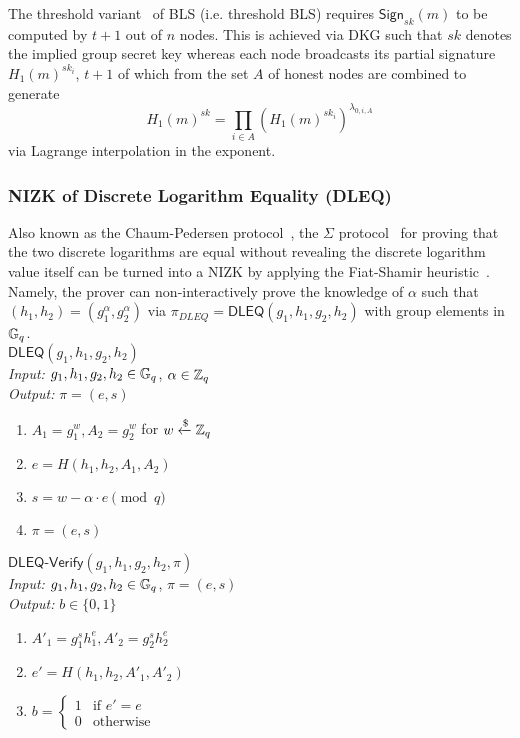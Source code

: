 The threshold variant~\cite{boldyreva2003threshold} of BLS (i.e. threshold BLS) requires $\mathsf{Sign}_{sk}(m)$ to be computed by $t + 1$ out of $n$ nodes. This is achieved via DKG such that $sk$ denotes the implied group secret key whereas each node broadcasts its partial signature $H_1(m)^{sk_i}$, $t + 1$ of which from the set $A$ of honest nodes are combined to generate
\[
H_1(m)^{sk} = \prod_{i \in A} \left(H_1(m)^{sk_i}\right)^{\lambda_{0, i, A}}
\]
via Lagrange interpolation in the exponent.

\subsubsection{NIZK of Discrete Logarithm Equality (DLEQ)}
\label{appendix:dleq}
Also known as the Chaum-Pedersen protocol~\cite{chaum1992wallet}, the $\Sigma$ protocol~\cite{damgaard2002sigma} for proving that the two discrete logarithms are equal without revealing the discrete logarithm value itself can be turned into a NIZK by applying the Fiat-Shamir heuristic~\cite{fiat1986prove}. Namely, the prover can non-interactively prove the knowledge of $\alpha$ such that $(h_1, h_2) = (g_1^\alpha, g_2^\alpha)$ via $\pi_{DLEQ} = \mathsf{DLEQ}(g_1, h_1, g_2, h_2)$ with group elements in $\mathbb{G}_q$.\\

\noindent\underline{$\mathsf{DLEQ}(g_1, h_1, g_2, h_2)$}\\
\textit{Input:} $g_1, h_1, g_2, h_2 \in \mathbb{G}_q$, $\alpha \in \mathbb{Z}_q$\\
\textit{Output:} $\pi = (e, s)$
\vspace{-\topsep}
\begin{enumerate}
\item $A_1 = g_1^w, A_2 = g_2^w$ for $w \xleftarrow{\$} \mathbb{Z}_q$
\item $e = H(h_1, h_2, A_1, A_2)$
\item $s = w - \alpha \cdot e \pmod q$
\item $\pi = (e, s)$
\end{enumerate}

\noindent\underline{$\mathsf{DLEQ}\text{-}\mathsf{Verify}(g_1, h_1, g_2, h_2, \pi)$}\\
\textit{Input:} $g_1, h_1, g_2, h_2 \in \mathbb{G}_q$, $\pi = (e, s)$\\
\textit{Output:} $b \in \{0, 1\}$
\vspace{-\topsep}
\begin{enumerate}
\item $A'_1 = g_1^s h_1^e, A'_2 = g_2^s h_2^e$
\item $e' = H(h_1, h_2, A'_1, A'_2)$
\item $b = \begin{cases}
1 & \text{if $e' = e$}\\
0 & \text{otherwise}
\end{cases}$
\end{enumerate}

